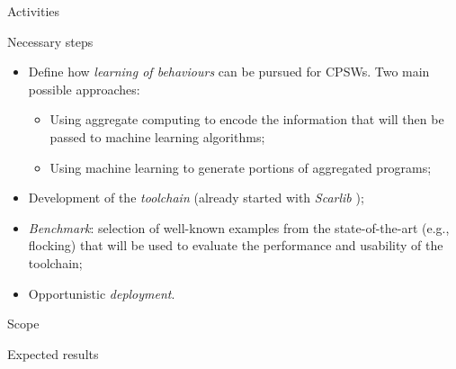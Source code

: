 \documentclass[presentation]{beamer}\mode<presentation>{\usetheme{AMSBolognaFC}}
\begin{document}
\begin{frame}[c]{Activities}

\begin{block}{Necessary steps}
	\begin{itemize}
		\item Define how \emph{learning of behaviours} can be pursued for CPSWs. 
			Two main possible approaches:
			\begin{itemize}
				\item Using aggregate computing to encode the information that will then be 
					passed to machine learning algorithms;
				\item Using machine learning to generate portions of aggregated programs;
			\end{itemize}
		\item Development of the \emph{toolchain} (already started with \emph{Scarlib} \cite{scarlib});
		\item \emph{Benchmark}: selection of well-known examples from the state-of-the-art (e.g., flocking) 
			that will be used to evaluate the performance and usability of the toolchain;
		\item Opportunistic \emph{deployment}.
	\end{itemize}
\end{block}
	
\end{frame}

\begin{frame}[c]{Scope}

\end{frame}


\begin{frame}[c]{Expected results}

\end{frame}



\section*{}

\frame{\titlepage}

\section*{\refname}

\begin{frame}{\refname}
	\tiny
	\nocite{*}
	\printbibliography
\end{frame}

\end{document}
